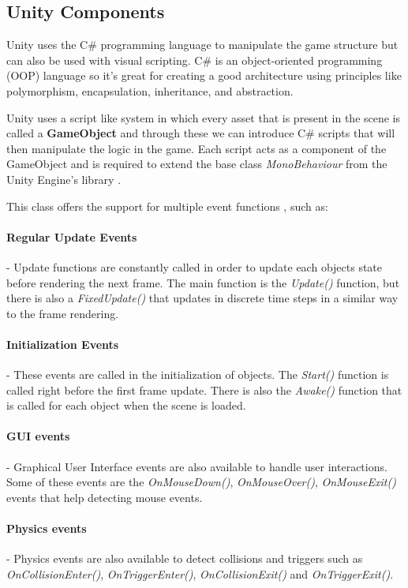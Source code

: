 \newpage
\subsection{Unity Components}
Unity uses the C\# programming language to manipulate the game structure but can also be used with visual scripting. C\# is an object-oriented programming (OOP) language so it's great for creating a good architecture using principles like polymorphism, encapsulation, inheritance, and abstraction.

Unity uses a script like system in which every asset that is present in the scene is called a \textbf{GameObject} and through these we can introduce C\# scripts that will then manipulate the logic in the game. Each script acts as a component of the GameObject and is required to extend the base class \textit{MonoBehaviour} from the Unity Engine's library \cite{unityDocMonoBehaviour}.

This class offers the support for multiple event functions \cite{unityDocEvent}, such as:

\paragraph{Regular Update Events} - Update functions are constantly called in order to update each objects state before rendering the next frame. The main function is the \textit{Update()} function, but there is also a \textit{FixedUpdate()} that updates in discrete time steps in a similar way to the frame rendering.

\paragraph{Initialization Events} - These events are called in the initialization of objects. The \textit{Start()} function is called right before the first frame update. There is also the \textit{Awake()} function that is called for each object when the scene is loaded. 

\paragraph{GUI events} - Graphical User Interface events are also available to handle user interactions. Some of these events are the \textit{OnMouseDown()}, \textit{OnMouseOver()}, \textit{OnMouseExit()} events that help detecting mouse events.

\paragraph{Physics events} - Physics events are also available to detect collisions and triggers such as \textit{OnCollisionEnter()}, \textit{OnTriggerEnter()}, \textit{OnCollisionExit()} and \textit{OnTriggerExit()}.

